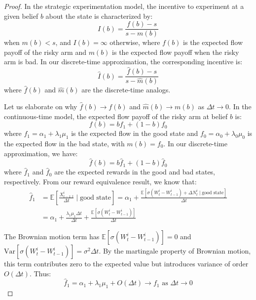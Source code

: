 \documentclass[a4paper,12pt]{report}
\begin{document}
    \begin{proof}
        In the strategic experimentation model, the incentive to experiment at a given belief $b$ about the state is characterized by:
        \begin{equation}
            I(b) = \frac{f(b) - s}{s - m(b)}
        \end{equation}
        when $m(b) < s$, and $I(b) = \infty$ otherwise, where $f(b)$ is the expected flow payoff of the risky arm and $m(b)$ is the expected flow payoff when the risky arm is bad. In our discrete-time approximation, the corresponding incentive is:
        \begin{equation}
            \hat{I}(b) = \frac{\hat{f}(b) - s}{s - \hat{m}(b)}
        \end{equation}
        where $\hat{f}(b)$ and $\hat{m}(b)$ are the discrete-time analogs.

        Let us elaborate on why $\hat{f}(b) \to f(b)$ and $\hat{m}(b) \to m(b)$ as $\Delta t \to 0$. In the continuous-time model, the expected flow payoff of the risky arm at belief $b$ is:
        \begin{equation}
            f(b) = b f_1 + (1-b) f_0
        \end{equation}
        where $f_1 = \alpha_1 + \lambda_1\mu_1$ is the expected flow in the good state and $f_0 = \alpha_0 + \lambda_0\mu_0$ is the expected flow in the bad state, with $m(b) = f_0$. In our discrete-time approximation, we have:
        \begin{equation}
            \hat{f}(b) = b \hat{f}_1 + (1-b) \hat{f}_0
        \end{equation}
        where $\hat{f}_1$ and $\hat{f}_0$ are the expected rewards in the good and bad states, respectively.
        From our reward equivalence result, we know that:
        \begin{align}
            \hat{f}_1 & = \mathbb{E}\left[\frac{X^i_{t-1:t}}{\Delta t} \mid \text{good state}\right] = \alpha_1 + \frac{\mathbb{E}[\sigma(W^i_t - W^i_{t-1}) + \Delta N^i_t \mid \text{good state}]}{\Delta t} \\
                      & = \alpha_1 + \frac{\lambda_1\mu_1\Delta t}{\Delta t} + \frac{\mathbb{E}[\sigma(W^i_t - W^i_{t-1})]}{\Delta t}
        \end{align}

        The Brownian motion term has $\mathbb{E}[\sigma(W^i_t - W^i_{t-1})] = 0$ and $\text{Var}[\sigma(W^i_t - W^i_{t-1})] = \sigma^2 \Delta t$. By the martingale property of Brownian motion, this term contributes zero to the expected value but introduces variance of order $O(\Delta t)$. Thus:
        \begin{equation}
            \hat{f}_1 = \alpha_1 + \lambda_1\mu_1 + O(\Delta t) \to f_1 \text{ as } \Delta t \to 0
        \end{equation}


\end{proof}
\end{document}
